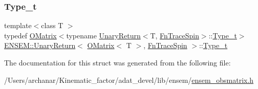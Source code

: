 \subsubsection{\texorpdfstring{Type\_t}{Type\_t}\hspace{0.1cm}{\footnotesize\ttfamily [2/2]}}
{\footnotesize\ttfamily template$<$class T $>$ \\
typedef \mbox{\hyperlink{classENSEM_1_1OMatrix}{O\+Matrix}}$<$typename \mbox{\hyperlink{structENSEM_1_1UnaryReturn}{Unary\+Return}}$<$T, \mbox{\hyperlink{structENSEM_1_1FnTraceSpin}{Fn\+Trace\+Spin}}$>$\+::\mbox{\hyperlink{structENSEM_1_1UnaryReturn_3_01OMatrix_3_01T_01_4_00_01FnTraceSpin_01_4_a9d6cbecc05de075e41d52fd0b7f2b55e}{Type\+\_\+t}}$>$ \mbox{\hyperlink{structENSEM_1_1UnaryReturn}{E\+N\+S\+E\+M\+::\+Unary\+Return}}$<$ \mbox{\hyperlink{classENSEM_1_1OMatrix}{O\+Matrix}}$<$ T $>$, \mbox{\hyperlink{structENSEM_1_1FnTraceSpin}{Fn\+Trace\+Spin}} $>$\+::\mbox{\hyperlink{structENSEM_1_1UnaryReturn_3_01OMatrix_3_01T_01_4_00_01FnTraceSpin_01_4_a9d6cbecc05de075e41d52fd0b7f2b55e}{Type\+\_\+t}}}



The documentation for this struct was generated from the following file\+:\begin{DoxyCompactItemize}
\item 
/\+Users/archanar/\+Kinematic\+\_\+factor/adat\+\_\+devel/lib/ensem/\mbox{\hyperlink{lib_2ensem_2ensem__obsmatrix_8h}{ensem\+\_\+obsmatrix.\+h}}\end{DoxyCompactItemize}
